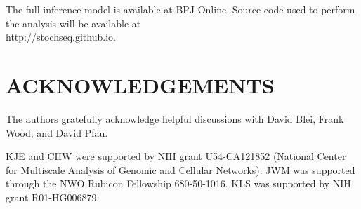 \documentclass{biophys_letter}
\begin{document}
The full inference model is available at BPJ Online. Source code used to perform the analysis will be available at \\http://stochseq.github.io.

\section*{ACKNOWLEDGEMENTS}

The authors gratefully acknowledge helpful discussions with David Blei, Frank Wood, and David Pfau.

KJE and CHW were supported by NIH grant U54-CA121852 (National Center for Multiscale Analysis of Genomic and Cellular Networks). JWM was supported through the NWO Rubicon Fellowship 680-50-1016. KLS was supported by NIH grant R01-HG006879.
\end{document}

